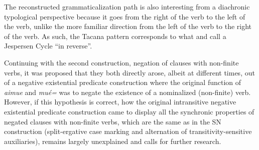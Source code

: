 \documentclass[output=paper]{langsci/langscibook}
\begin{document}
The reconstructed grammaticalization path is also interesting from a
diachronic typological perspective because it goes from the right of the
verb to the left of the verb, unlike the more familiar direction from the
left of the verb to the right of the verb. As such, the Tacana pattern
corresponds to what \citet{AuweraVossen2016} and \citet{Vossen2016} call a
Jespersen Cycle ``in reverse''.

Continuing with the second construction, negation of clauses with
non-finite verbs, it was proposed that they both directly arose, albeit at
different times, out of a negative existential predicate construction where
the original function of \textit{aimue} and \textit{mué=} was to negate the
existence of a nominalized (non-finite) verb. However, if this hypothesis
is correct, how the original
intransitive negative existential predicate construction came to display all the synchronic properties
of negated clauses with non-finite verbs, which are the same as in the SN
construction (split-ergative case marking
and alternation of transitivity-sensitive auxiliaries), remains
largely unexplained and calls for further research.

\end{document}
